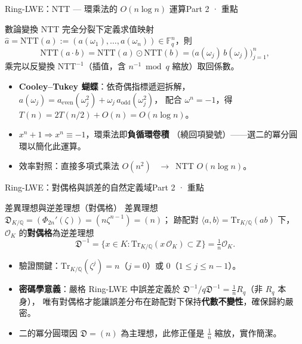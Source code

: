\documentclass[aspectratio=169, 11pt]{beamer}
\newcommand{\Z}{\mathbb{Z}}
\newcommand{\Q}{\mathbb{Q}}
\newcommand{\F}{\mathbb{F}}
\newcommand{\OK}{\mathcal{O}_K}
\newcommand{\Tr}{\mathrm{Tr}}
\begin{document}
\begin{frame}{Ring-LWE：NTT — 環乘法的 $O(n\log n)$ 運算}{Part 2 · 重點}
  \begin{block}{數論變換 NTT}
    完全分裂下定義求值映射
    $\widehat{a}=\mathrm{NTT}(a):=(a(\omega_1),\dots,a(\omega_n))\in\F_q^n$，則
    \[
      \mathrm{NTT}(a\cdot b)=\mathrm{NTT}(a)\odot\mathrm{NTT}(b)
      =\bigl(a(\omega_j)\,b(\omega_j)\bigr)_{j=1}^n,
    \]
    乘完以反變換 $\mathrm{NTT}^{-1}$（插值，含 $n^{-1}\bmod q$ 縮放）取回係數。
  \end{block}
  \begin{itemize}\small
    \item \textbf{Cooley–Tukey 蝴蝶}：依奇偶指標遞迴拆解，
      $a(\omega_j)=a_{\text{even}}(\omega_j^2)+\omega_j\,a_{\text{odd}}(\omega_j^2)$，
      配合 $\omega^n=-1$，得 $T(n)=2T(n/2)+O(n)=O(n\log n)$。
    \item $x^n+1\Rightarrow x^n\equiv-1$，環乘法即\textbf{負循環卷積}
      （繞回項變號）——選二的冪分圓環以簡化此運算。
    \item 效率對照：直接多項式乘法 $O(n^2)$ \ $\to$\ NTT $O(n\log n)$。
  \end{itemize}
\end{frame}

\begin{frame}{Ring-LWE：對偶格與誤差的自然定義域}{Part 2 · 重點}
  \begin{block}{差異理想與逆差理想（對偶格）}
    差異理想 $\mathfrak{D}_{K/\Q}=(\Phi_{2n}'(\zeta))=(n\zeta^{n-1})=(n)$；
    跡配對 $\langle a,b\rangle=\Tr_{K/\Q}(ab)$ 下，$\OK$ 的\textbf{對偶格}為逆差理想
    \[
      \mathfrak{D}^{-1}=\{x\in K:\Tr_{K/\Q}(x\,\OK)\subset\Z\}=\tfrac1n\OK.
    \]
  \end{block}
  \begin{itemize}\small
    \item 驗證關鍵：$\Tr_{K/\Q}(\zeta^j)=n$（$j=0$）或 $0$（$1\le j\le n-1$）。
    \item \textbf{密碼學意義}：嚴格 Ring-LWE 中誤差定義於
      $\mathfrak{D}^{-1}/q\mathfrak{D}^{-1}=\tfrac1n R_q$（非 $R_q$ 本身），
      唯有對偶格才能讓誤差分布在跡配對下保持\textbf{代數不變性}，確保歸約嚴密。
    \item 二的冪分圓環因 $\mathfrak{D}=(n)$ 為主理想，此修正僅是 $\tfrac1n$ 縮放，實作簡潔。
  \end{itemize}
\end{frame}
\end{document}

